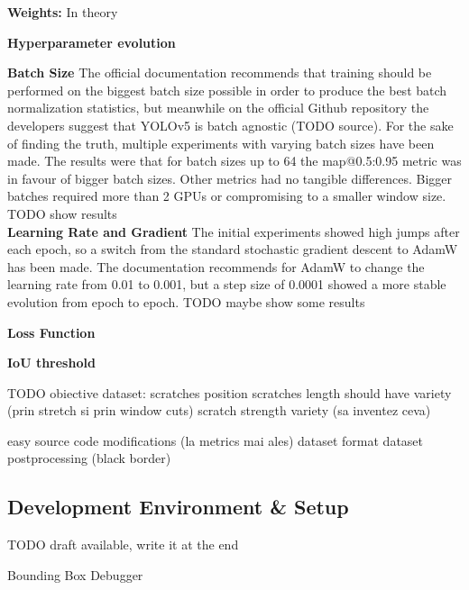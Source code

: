 \textbf{Weights:}
In theory

\textbf{Hyperparameter evolution}

\textbf{Batch Size}
The official documentation recommends that training should be performed on the biggest batch size possible in order to produce the best batch normalization statistics, but meanwhile on the official Github repository the developers suggest that YOLOv5 is batch agnostic (TODO source). For the sake of finding the truth, multiple experiments with varying batch sizes have been made. The results were that for batch sizes up to 64 the map@0.5:0.95 metric was in favour of bigger batch sizes. Other metrics had no tangible differences. Bigger batches required more than 2 GPUs or compromising to a smaller window size. \\
TODO show results \\

\textbf{Learning Rate and Gradient}
The initial experiments showed high jumps after each epoch, so a switch from the standard stochastic gradient descent to AdamW has been made. The documentation recommends for AdamW to change the learning rate from 0.01 to 0.001, but a step size of 0.0001 showed a more stable evolution from epoch to epoch.
TODO maybe show some results

\textbf{Loss Function}


\textbf{IoU threshold}


TODO obiective dataset:
scratches position
scratches length should have variety (prin stretch si prin window cuts)
scratch strength variety (sa inventez ceva)

easy source code modifications (la metrics mai ales)
dataset format
dataset postprocessing (black border)



\subsection{Development Environment \& Setup}
TODO draft available, write it at the end

Bounding Box Debugger

